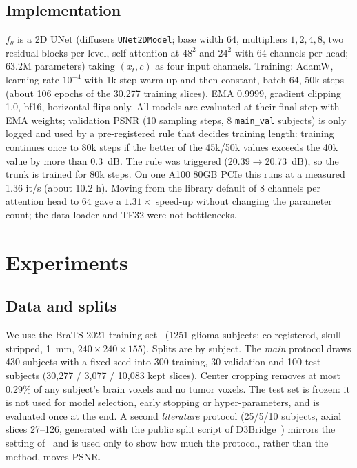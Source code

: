 \documentclass[journal]{IEEEtran}
\begin{document}
\subsection{Implementation}
$f_\theta$ is a 2D UNet (diffusers \texttt{UNet2DModel}; base width 64, multipliers $1,2,4,8$, two residual blocks per level,
self-attention at $48^2$ and $24^2$ with 64 channels per head; 63.2M parameters) taking $(x_t,c)$ as four input channels.
Training: AdamW, learning rate $10^{-4}$ with 1k-step warm-up and then constant, batch 64, 50k steps (about 106 epochs of the
30{,}277 training slices), EMA 0.9999, gradient clipping 1.0, bf16, horizontal flips only. All models are evaluated at their final step with EMA weights; validation PSNR (10 sampling steps, 8 \texttt{main\_val} subjects) is only logged and used by a pre-registered rule that decides training length: training continues once to 80k steps if the better of the 45k/50k values exceeds the 40k value by more than 0.3~dB. The rule was triggered (20.39$\to$20.73~dB), so the trunk is trained for 80k steps. On one A100
80GB PCIe this runs at a measured 1.36 it/s (about 10.2 h). Moving from the library default of 8 channels per attention head to 64
gave a $1.31\times$ speed-up without changing the parameter count; the data loader and TF32 were not bottlenecks.

\section{Experiments}
\subsection{Data and splits}
We use the BraTS 2021 training set~\cite{baid2021brats,menze2015brats,bakas2017advancing} (1251 glioma subjects; co-registered,
skull-stripped, 1~mm, $240\times240\times155$). Splits are by subject. The \emph{main} protocol draws 430 subjects with a
fixed seed into 300 training, 30 validation and 100 test subjects (30{,}277 / 3{,}077 / 10{,}083 kept slices). Center
cropping removes at most 0.29\% of any subject's brain voxels and no tumor voxels. The test set is frozen: it is not used for
model selection, early stopping or hyper-parameters, and is evaluated once at the end. A second \emph{literature} protocol
(25/5/10 subjects, axial slices 27--126, generated with the public split script of D3Bridge~\cite{xie2026d3bridge}) mirrors the setting of~\cite{yang2026wrb} and is used only to show how much the
protocol, rather than the method, moves PSNR.
\end{document}
